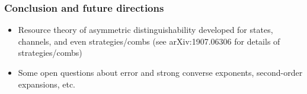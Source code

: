 \documentclass[usenames,dvipsnames,handout]{beamer}
\begin{document}
\begin{frame}
\frametitle{Conclusion and future directions}

\begin{itemize}
\pause
\item Resource theory of asymmetric distinguishability developed for states, channels, and even strategies/combs (see arXiv:1907.06306 for details of strategies/combs)

\pause
\vspace{.2in}
\item Some open questions about error and strong converse exponents, second-order expansions, etc.


\end{itemize}

\end{frame}


%
%
%
%
%
%
%
%
%
%
%
%
%
%
%
%
%
%
%
%
%
%
%
%
%
%
%
%
%
%
%
%
%
\end{document}
